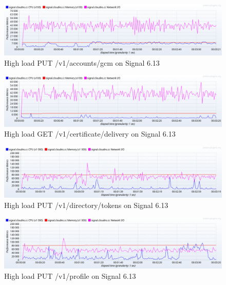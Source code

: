 \begin{figure}[H]
    \centering
    \includegraphics[width=\textwidth]{images/613/create-load-5}
    \caption{High load PUT /v1/accounts/gcm on Signal 6.13}
    \label{fig:signalload5new}
\end{figure}

\begin{figure}[H]
    \centering
    \includegraphics[width=\textwidth]{images/613/create-load-6}
    \caption{High load GET /v1/certificate/delivery on Signal 6.13}
    \label{fig:signalload6new}
\end{figure}

\begin{figure}[H]
    \centering
    \includegraphics[width=\textwidth]{images/613/create-load-7}
    \caption{High load PUT /v1/directory/tokens on Signal 6.13}
    \label{fig:signalload7new}
\end{figure}

\begin{figure}[H]
    \centering
    \includegraphics[width=\textwidth]{images/613/create-load-8}
    \caption{High load PUT /v1/profile on Signal 6.13}
    \label{fig:signalload8new}
\end{figure}

